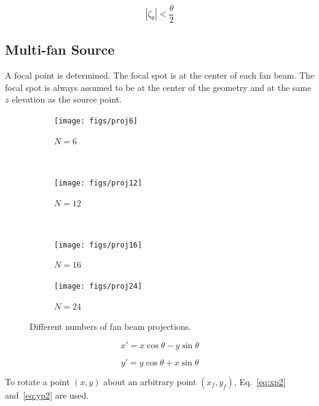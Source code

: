 \begin{equation}\label{eq:thetacoscon}
|\zeta_\theta| < \frac{\theta}{2}
\end{equation}


\subsection{Multi-fan Source}
A focal point is determined. The focal spot is at the center of each fan beam. The focal spot is always assumed to be at the center of the geometry and at the same $z$ elevation as the source point.

\begin{figure}
    \centering
    \begin{subfigure}[b]{0.2\textwidth}
        \texttt{[image: figs/proj6]}
        \caption{$N=6$}
        \label{fig:proj6}
    \end{subfigure}
    ~ %
    \begin{subfigure}[b]{0.2\textwidth}
        \texttt{[image: figs/proj12]}
        \caption{$N=12$}
        \label{fig:proj12}
    \end{subfigure}
    ~ %
    \begin{subfigure}[b]{0.2\textwidth}
        \texttt{[image: figs/proj16]}
        \caption{$N=16$}
        \label{fig:proj16}
    \end{subfigure}
    \begin{subfigure}[b]{0.2\textwidth}
        \texttt{[image: figs/proj24]}
        \caption{$N=24$}
        \label{fig:proj24}
    \end{subfigure}
    \caption{Different numbers of fan beam projections.}\label{fig:fanproj}
\end{figure}

\begin{equation}\label{eq:xp}
x' = x \cos \theta - y \sin \theta
\end{equation}

\begin{equation}\label{eq:yp}
y' = y \cos \theta + x \sin \theta
\end{equation}

To rotate a point $(x,y)$ about an arbitrary point $(x_f, y_f)$, Eq.~\ref{eq:xp2} and~\ref{eq:yp2} are used.

